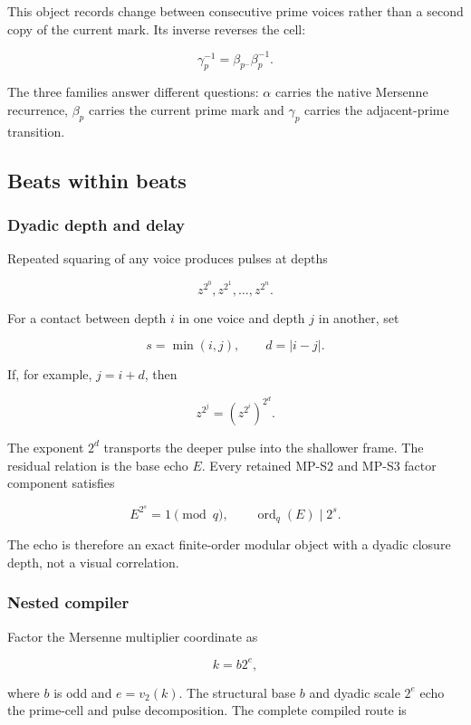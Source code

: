 This object records change between consecutive prime voices rather than
a second copy of the current mark. Its inverse reverses the cell:

\[
\gamma_p^{-1}=\beta_{p^-}\beta_p^{-1}.
\]

The three families answer different questions: \(\alpha\) carries the
native Mersenne recurrence, \(\beta_p\) carries the current prime mark
and \(\gamma_p\) carries the adjacent-prime transition.

\subsection{Beats within beats}\label{viii-ch10-beats-within-beats}

\subsubsection{Dyadic depth and delay}\label{viii-ch10-dyadic-depth-and-delay}

Repeated squaring of any voice produces pulses at depths

\[
z^{2^0},z^{2^1},\ldots,z^{2^n}.
\]

For a contact between depth \(i\) in one voice and depth \(j\) in
another, set

\[
s=\min(i,j),
\qquad
d=|i-j|.
\]

If, for example, \(j=i+d\), then

\[
z^{2^j}=\left(z^{2^i}\right)^{2^d}.
\]

The exponent \(2^d\) transports the deeper pulse into the shallower
frame. The residual relation is the base echo \(E\). Every retained
MP-S2 and MP-S3 factor component satisfies

\[
E^{2^s}=1\pmod q,
\qquad
\operatorname{ord}_q(E)\mid2^s.
\]

The echo is therefore an exact finite-order modular object with a dyadic
closure depth, not a visual correlation.

\subsubsection{Nested compiler}\label{viii-ch10-nested-compiler}

Factor the Mersenne multiplier coordinate as

\[
k=b2^e,
\]

where \(b\) is odd and \(e=v_2(k)\). The structural base \(b\) and
dyadic scale \(2^e\) echo the prime-cell and pulse decomposition. The
complete compiled route is

